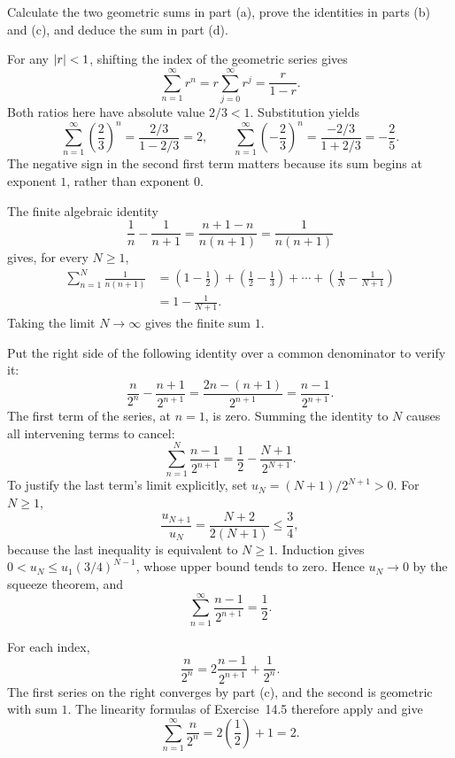 \goal Calculate the two geometric sums in part (a), prove the
identities in parts (b) and (c), and deduce the sum in part (d).

For any $\left|r\right|<1$, shifting the index of the geometric series gives
\[
 \sum_{n=1}^{\infty}r^n
 =r\sum_{j=0}^{\infty}r^j=\frac{r}{1-r}.
\]
Both ratios here have absolute value $2/3<1$. Substitution yields
\[
 \sum_{n=1}^{\infty}\left(\frac23\right)^n
 =\frac{2/3}{1-2/3}=2,
 \qquad
 \sum_{n=1}^{\infty}\left(-\frac23\right)^n
 =\frac{-2/3}{1+2/3}=-\frac25.
\]
The negative sign in the second first term matters because its
sum begins at exponent $1$, rather than exponent $0$.

The finite algebraic identity
\[
 \frac1n-\frac1{n+1}
 =\frac{n+1-n}{n(n+1)}=\frac1{n(n+1)}
\]
gives, for every $N\ge1$,
\[
 \begin{aligned}
 \sum_{n=1}^{N}\frac1{n(n+1)}
 &=(1-\tfrac12)+(\tfrac12-\tfrac13)+\cdots
      +(\tfrac1N-\tfrac1{N+1})\\
 &=1-\frac1{N+1}.
 \end{aligned}
\]
Taking the limit $N\to\infty$ gives the finite sum $1$.

Put the right side of the following identity over a common
denominator to verify it:
\[
 \frac n{2^n}-\frac{n+1}{2^{n+1}}
 =\frac{2n-(n+1)}{2^{n+1}}
 =\frac{n-1}{2^{n+1}}.
\]
The first term of the series, at $n=1$, is zero. Summing the
identity to $N$ causes all intervening terms to cancel:
\[
 \sum_{n=1}^{N}\frac{n-1}{2^{n+1}}
 =\frac12-\frac{N+1}{2^{N+1}}.
\]
To justify the last term's limit explicitly, set
$u_N=(N+1)/2^{N+1}>0$. For $N\ge1$,
\[
 \frac{u_{N+1}}{u_N}=\frac{N+2}{2(N+1)}\le\frac34,
\]
because the last inequality is equivalent to $N\ge1$.
Induction gives $0<u_N\le u_1(3/4)^{N-1}$, whose upper bound
tends to zero. Hence $u_N\to0$ by the squeeze theorem, and
\[
 \sum_{n=1}^{\infty}\frac{n-1}{2^{n+1}}=\frac12.
\]

For each index,
\[
 \frac n{2^n}
 =2\frac{n-1}{2^{n+1}}+\frac1{2^n}.
\]
The first series on the right converges by part (c), and the
second is geometric with sum $1$. The linearity formulas of
Exercise~14.5 therefore apply and give
\[
 \sum_{n=1}^{\infty}\frac n{2^n}
 =2\left(\frac12\right)+1=2.
\]

